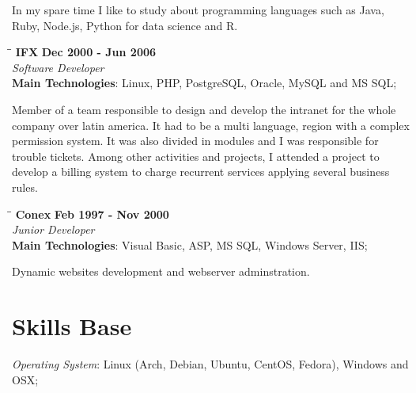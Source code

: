 \documentclass[margin]{res}
\begin{document}
\begin{resume}
In my spare time I like to study about programming languages such as Java, Ruby, Node.js, Python for data science and R.

\vspace{-0.1in}

\vspace{-0.1in}
   \begin{tabbing}
   \hspace{2.3in}\= \hspace{1.7in}\= \kill %
    \textbf{IFX}    \>\>\textbf{Dec 2000 - Jun 2006}\\
    \textit{Software Developer}\\        
    \textbf{Main Technologies}: Linux, PHP, PostgreSQL, Oracle, MySQL and MS SQL;
   \end{tabbing}\vspace{-20pt}      %
    \vspace{2mm}
        Member of a team responsible to design and develop the intranet for the whole company over latin america. 
        It had to be a multi language, region with a complex permission system. It was also divided in modules and I was responsible for trouble tickets.
        Among other activities and projects, I attended a project to develop a billing system to charge recurrent services applying several business rules.
\vspace{-0.1in}

   \begin{tabbing}
   \hspace{2.3in}\= \hspace{1.7in}\= \kill %
    \textbf{Conex}    \>\>\textbf{Feb 1997 - Nov 2000}\\
    \textit{Junior Developer}\\        
    \textbf{Main Technologies}: Visual Basic, ASP, MS SQL, Windows Server, IIS;
   \end{tabbing}\vspace{-20pt}      %
    \vspace{2mm}
      Dynamic websites development and webserver adminstration.  

\section{Skills Base}  

  \textit{Operating System}:  Linux (Arch, Debian, Ubuntu, CentOS, Fedora), Windows and OSX;


\end{resume}
\end{document}
